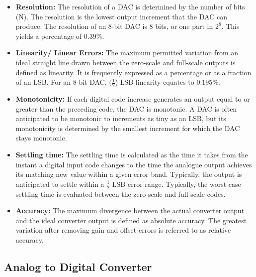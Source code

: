 \begin{itemize}
    \item \textbf{Resolution:} The resolution of a DAC is determined by the number of bits (N). The resolution is the lowest output increment that the DAC can produce. The resolution of an 8-bit DAC is 8 bits, or one part in $2^8$. This yields a percentage of $0.39\%$.\\
    \item \textbf{Linearity/ Linear Errors:} The maximum permitted variation from an ideal straight line drawn between the zero-scale and full-scale outputs is defined as linearity. It is frequently expressed as a percentage or as a fraction of an LSB. For an 8-bit DAC, ($\frac{1}{2}$) LSB linearity equates to $0.195\%$.\\
    \item \textbf{Monotonicity:} If each digital code increase generates an output equal to or greater than the preceding code, the DAC is monotonic. A DAC is often anticipated to be monotonic to increments as tiny as an LSB, but its monotonicity is determined by the smallest increment for which the DAC stays monotonic.\\
    \item \textbf{Settling time:} The settling time is calculated as the time it takes from the instant a digital input code changes to the time the analogue output achieves its matching new value within a given error band. Typically, the output is anticipated to settle within a $\frac{1}{2}$ LSB error range. Typically, the worst-case settling time is evaluated between the zero-scale and full-scale codes.\\
    \item \textbf{Accuracy:} The maximum divergence between the actual converter output and the ideal converter output is defined as absolute accuracy. The greatest variation after removing gain and offset errors is referred to as relative accuracy.
\end{itemize}
\subsection{Analog to Digital Converter}


